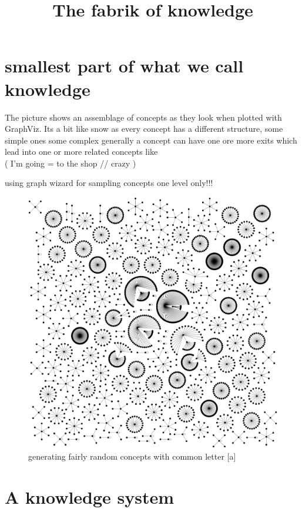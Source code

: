 \documentclass[11pt]{article}
\title{\textbf{The fabrik of knowledge}}
\begin{document}
\maketitle


\section{smallest part of what we call knowledge}
The picture shows an assemblage of concepts as they look when plotted with GraphViz.
Its a bit like snow as every concept has a different structure,
some simple ones some complex generally a concept can have one ore more 
exits which lead into one or more related concepts like\\
( I'm going = to the shop // crazy )

using graph wizard for sampling concepts one level only!!!


\begin{figure}[htp]
\includegraphics[scale=0.08]{img/a_directories.png}
\caption{generating fairly random concepts with common letter [a] }
\label{}
\end{figure}



\section{A knowledge system }
\end{document}
